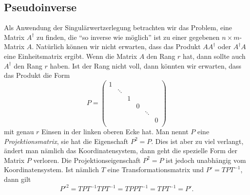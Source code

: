 \subsection{Pseudoinverse}
Als Anwendung der Singulärwertzerlegung betrachten wir das Problem, eine Matrix
$A^\dagger$
zu finden, die ``so inverse wie möglich'' ist zu einer gegebenen
$n\times m$-Matrix $A$.
Natürlich können wir nicht erwarten, dass das Produkt $AA^\dagger$ 
oder $A^\dagger A$
eine Einheitsmatrix ergibt.
Wenn die Matrix $A$ den Rang $r$ hat, dann sollte auch $A^\dagger$ den Rang $r$
haben.
Ist der Rang nicht voll, dann könnten wir erwarten, dass das Produkt die Form
\[
P=
\begin{pmatrix}
1&      & & &      & \\
 &\ddots& & &      & \\
 &      &1& &      & \\
 &      & &0&      & \\
 &      & & &\ddots& \\
 &      & & &      &0\\
\end{pmatrix}
\]
mit genau $r$ Einsen in der linken oberen Ecke hat.
Man nennt $P$ eine {\em Projektionsmatrix}, sie hat die Eigenschaft $P^2=P$.
Dies ist aber zu viel verlangt, ändert man nämlich das Koordinatensystem,
dann geht die spezielle Form der Matrix $P$ verloren.
Die Projektionseigenschaft $P^2=P$ ist jedoch unabhängig vom Koordinatensystem.
Ist nämlich $T$ eine Transformationsmatrix und $P'=TPT^{-1}$, dann gilt
\[
P'^2=TPT^{-1}TPT^{-1}=TPPT^{-1}=TPT^{-1}=P'.
\]

